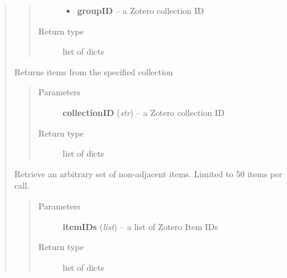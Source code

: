 \documentclass[letterpaper,10pt,english]{sphinxmanual}
\begin{document}
\begin{quote}
\begin{fulllineitems}
\begin{quote}
\begin{description}
\begin{itemize}
\item {} 
\textbf{groupID} -- a Zotero collection ID

\end{itemize}

\item[{Return type}] \leavevmode
list of dicts

\end{description}\end{quote}

\end{fulllineitems}


\begin{fulllineitems}
\label{index:pyzotero.zotero.Zotero.collection_items}
Returns items from the specified collection
\begin{quote}\begin{description}
\item[{Parameters}] \leavevmode
\textbf{collectionID} (\emph{str}) -- a Zotero collection ID

\item[{Return type}] \leavevmode
list of dicts

\end{description}\end{quote}

\end{fulllineitems}


\begin{fulllineitems}
\label{index:pyzotero.zotero.Zotero.get_subset}
Retrieve an arbitrary set of non-adjacent items. Limited to 50 items per call.
\begin{quote}\begin{description}
\item[{Parameters}] \leavevmode
\textbf{itemIDs} (\emph{list}) -- a list of Zotero Item IDs

\item[{Return type}] \leavevmode
list of dicts

\end{description}\end{quote}

\end{fulllineitems}

\end{quote}
\end{document}

